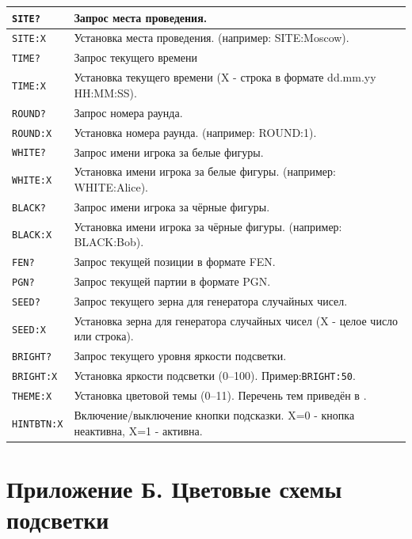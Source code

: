 \documentclass[a4paper,12pt]{article}
\begin{document}
\begin{longtable}{|p{}|p{}|}
\texttt{SITE?} & Запрос места проведения. \\ \hline
\texttt{SITE:X} & Установка места проведения. (например: SITE:Moscow). \\ \hline
\texttt{TIME?} & Запрос текущего времени \\ \hline
\texttt{TIME:X} & Установка текущего времени (X - строка в формате dd.mm.yy HH:MM:SS). \\ \hline
\texttt{ROUND?} & Запрос номера раунда. \\ \hline
\texttt{ROUND:X} & Установка номера раунда. (например: ROUND:1). \\ \hline
\texttt{WHITE?} & Запрос имени игрока за белые фигуры. \\ \hline
\texttt{WHITE:X} & Установка имени игрока за белые фигуры. (например: WHITE:Alice). \\ \hline
\texttt{BLACK?} & Запрос имени игрока за чёрные фигуры. \\ \hline
\texttt{BLACK:X} & Установка имени игрока за чёрные фигуры. (например: BLACK:Bob). \\ \hline
\texttt{FEN?} & Запрос текущей позиции в формате FEN. \\ \hline
\texttt{PGN?} & Запрос текущей партии в формате PGN. \\ \hline
\texttt{SEED?} & Запрос текущего зерна для генератора случайных чисел. \\ \hline
\texttt{SEED:X} & Установка зерна для генератора случайных чисел (X - целое число или строка). \\ \hline
\texttt{BRIGHT?} & Запрос текущего уровня яркости подсветки. \\ \hline
\texttt{BRIGHT:X} & Установка яркости подсветки (0–100). Пример:\texttt{BRIGHT:50}. \\ \hline
\texttt{THEME:X} & Установка цветовой темы (0–11). Перечень тем приведён в \nameref{sec:themes}. \\ \hline
\texttt{HINTBTN:X} & Включение/выключение кнопки подсказки. X=0 - кнопка неактивна, X=1 - активна. \\ \hline
\end{longtable}

\clearpage
\section*{Приложение Б. Цветовые схемы подсветки}
\label{sec:themes}
\end{document}
